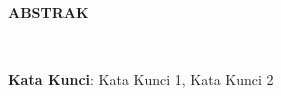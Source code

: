 \clearpage


\normalsize \bfseries \centering \MakeUppercase{Abstrak}
% 
\\[2\baselineskip]

\justifying \normalfont \normalsize{
	\blindtext
}

\textbf{Kata Kunci}: Kata Kunci 1, Kata Kunci 2
\clearpage